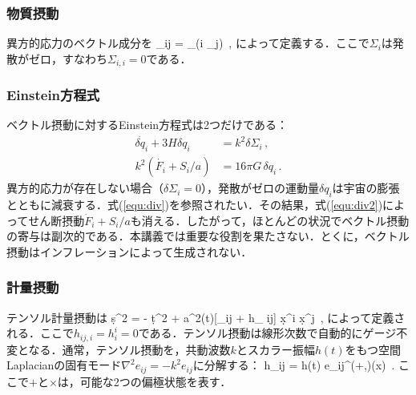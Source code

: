 \subsubsection{物質摂動}



異方的応力のベクトル成分を
\beq
\delta \Sigma_{ij} = \partial_{(i} \Sigma_{j)}\, , 
\eeq
によって定義する．ここで$\Sigma_i$は発散がゼロ，すなわち$\Sigma_{i,i} =0$である．



\subsubsection{Einstein方程式}



ベクトル摂動に対するEinstein方程式は2つだけである：
\begin{align}
\dot{\delta q_i} + 3 H \delta q_i &= k^2 \delta \Sigma_i\, , \label{equ:div}  \\
k^2 (\dot {F_i} + S_i/a) & = 16 \pi G \, \delta q_i\, . \label{equ:div2}
\end{align}
異方的応力が存在しない場合（$\delta \Sigma_i = 0$），発散がゼロの運動量$\delta q_i$は宇宙の膨張とともに減衰する．式(\ref{equ:div})を参照されたい．その結果，式(\ref{equ:div2})によってせん断摂動$\dot F_i + S_i/a$も消える．したがって，ほとんどの状況でベクトル摂動の寄与は副次的である．本講義では重要な役割を果たさない．とくに，ベクトル摂動はインフレーションによって生成されない．





\subsubsection{計量摂動}



テンソル計量摂動は
\beq
\label{equ:Tmetric}
\d s^2 = - \d t^2 + a^2(t)[\delta_{ij} +  h_{ ij}] \d x^i \d x^j\, ,
\eeq
によって定義される．ここで$h_{ij, i} = h^{i}_i = 0$である．テンソル摂動は線形次数で自動的にゲージ不変となる．通常，テンソル摂動を，共動波数$k$とスカラー振幅$h(t)$をもつ空間Laplacianの固有モード$\nabla^2 e_{ij} = - k^2 e_{ij}$に分解する：
\beq
h_{ij} = h(t) e_{ij}^{(+,\times)}(x)\, .
\eeq
ここで$+$と$\times$は，可能な2つの偏極状態を表す．





